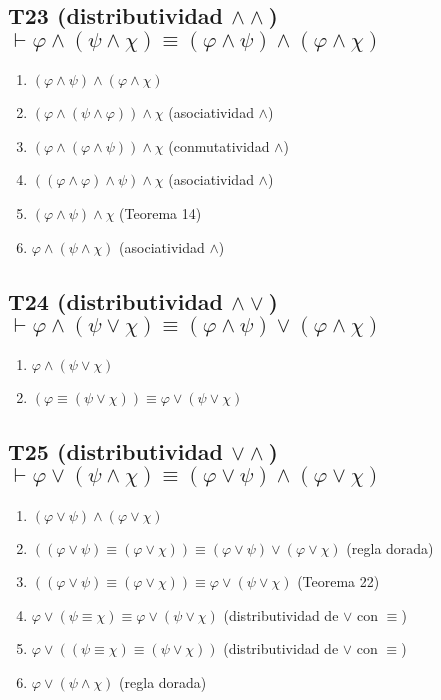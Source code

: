 \documentclass[a4paper,11pt]{article}
\begin{document}
\subsection{T23 (distributividad $\land\land$) $\vdash \varphi \land (\psi \land \chi) \equiv (\varphi \land \psi) \land (\varphi \land \chi)$}

\begin{enumerate}
    \item $(\varphi \land \psi) \land (\varphi \land \chi)$
    \item $(\varphi \land (\psi \land \varphi)) \land \chi$ \hfill (asociatividad $\land$)
    \item $(\varphi \land (\varphi \land \psi)) \land \chi$ \hfill (conmutatividad $\land$)
    \item $((\varphi \land \varphi) \land \psi) \land \chi$ \hfill (asociatividad $\land$)
    \item $(\varphi \land \psi) \land \chi$ \hfill (Teorema 14)
    \item $\varphi \land (\psi \land \chi)$ \hfill (asociatividad $\land$)
\end{enumerate}

\subsection{T24 (distributividad $\land\lor$) $\vdash \varphi \land (\psi \lor \chi) \equiv (\varphi \land \psi) \lor (\varphi \land \chi)$}

\begin{enumerate}
    \item $\varphi \land (\psi \lor \chi)$
    \item $(\varphi \equiv (\psi \lor \chi)) \equiv \varphi \lor (\psi \lor \chi)$
\end{enumerate}


\subsection{T25 (distributividad $\lor\land$) $\vdash \varphi \lor (\psi \land \chi) \equiv (\varphi \lor \psi) \land (\varphi \lor \chi)$}

\begin{enumerate}
    \item $(\varphi \lor \psi) \land (\varphi \lor \chi)$
    \item $((\varphi \lor \psi) \equiv (\varphi \lor \chi)) \equiv (\varphi \lor \psi) \lor (\varphi \lor \chi)$ \hfill (regla dorada)
    \item $((\varphi \lor \psi) \equiv (\varphi \lor \chi)) \equiv \varphi \lor (\psi \lor \chi)$ \hfill (Teorema 22)
    \item $\varphi \lor (\psi \equiv \chi) \equiv \varphi \lor (\psi \lor \chi)$ \hfill (distributividad de $\lor$ con $\equiv$)
    \item $\varphi \lor ((\psi \equiv \chi) \equiv (\psi \lor \chi))$ \hfill (distributividad de $\lor$ con $\equiv$)
    \item $\varphi \lor (\psi \land \chi)$ \hfill (regla dorada)
\end{enumerate}
\end{document}
